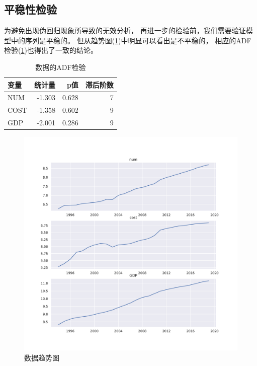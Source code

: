 \documentclass{article}
\def\NUM{\mathrm{NUM}}
\def\COST{\mathrm{COST}}
\def\GDP{\mathrm{GDP}}
\begin{document}
    \subsection{平稳性检验}
    为避免出现伪回归现象所导致的无效分析，
    再进一步的检验前，我们需要验证模型中的序列是平稳的。
    但从趋势图(\cref{fig:data trend})中明显可以看出是不平稳的，
    相应的ADF检验(\cref{tab:data adf})也得出了一致的结论。
    \begin{table}[h]
        \caption{数据的ADF检验}
        \label{tab:data adf}
        \centering
        \begin{tabular}{lrrr}
            \toprule
            变量 & 统计量 & p值 & 滞后阶数 \\
            \midrule
            $\NUM$  & -1.303 & 0.628 & 7 \\
            $\COST$ & -1.358 & 0.602 & 9 \\
            $\GDP$  & -2.001 & 0.286 & 9 \\
            \bottomrule
        \end{tabular}
    \end{table}

    \begin{figure}[h]
        \includegraphics[width=\textwidth]{trend}
        \caption{数据趋势图}
        \label{fig:data trend}
    \end{figure}
\end{document}
